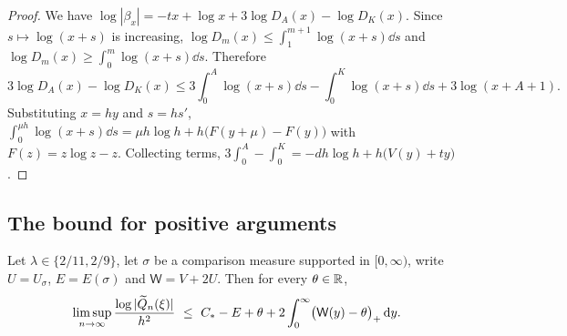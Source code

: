 \begin{proof}
We have $\log|\beta_x|=-tx+\log x+3\log D_A(x)-\log D_K(x)$. Since $s\mapsto\log(x+s)$ is increasing, $\log D_m(x)\le\int_1^{m+1}\log(x+s)\dd s$ and $\log D_m(x)\ge\int_0^m\log(x+s)\dd s$. Therefore
\[
3\log D_A(x)-\log D_K(x)\le3\int_0^A\log(x+s)\dd s-\int_0^K\log(x+s)\dd s+3\log(x+A+1).
\]
Substituting $x=hy$ and $s=hs'$, $\int_0^{\mu h}\log(x+s)\dd s=\mu h\log h+h\bigl(F(y+\mu)-F(y)\bigr)$ with $F(z)=z\log z-z$. Collecting terms, $3\int_0^A-\int_0^K=-dh\log h+h\bigl(V(y)+ty\bigr)$.
\end{proof}

\subsection{The bound for positive arguments}\label{sec:positive-bound}

\begin{proposition}\label{prop:positive-bound}
Let $\lambda\in\{2/11,2/9\}$, let $\sigma$ be a comparison measure supported in $[0,\infty)$, write $U=U_\sigma$, $E=E(\sigma)$ and $\mathsf W=V+2U$. Then for every $\theta\in\mathbb{R}$,
\[
\limsup_{n\to\infty}\frac{\log|\Qt_n(\xi)|}{h^2}\ \le\ \Cst-E+\theta+2\int_0^\infty\bigl(\mathsf W(y)-\theta\bigr)_+\dd y .
\]
\end{proposition}

